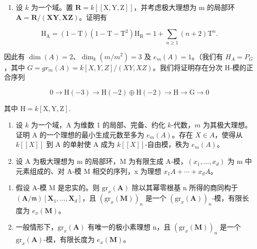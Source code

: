 \begin{enumerate}
\def\labelenumi{\arabic{enumi})}
\setcounter{enumi}{4}
\tightlist
\item
  设 \(k\) 为一个域。置 \(\mathbf{R} = k[[\mathrm{X},\mathrm{Y},\mathrm{Z}]]\)，并考虑极大理想为 m 的局部环 \(\mathbf{A} = \mathbf{R}/(\mathbf{XY},\mathbf{X}\mathbf{Z})\)。证明有
\end{enumerate}

\[
\mathrm{H} _ {\mathrm{A}} = (1 - \mathrm{T}) (1 - \mathrm{T} - \mathrm{T} ^ {2}) \mathrm{H} _ {\mathrm{R}} = 1 + \sum_ {n \geqslant 1} (n + 2) \mathrm{T} ^ {n}.
\]

因此有 \(\dim(A) = 2\)、\(\dim_k(m/m^2) = 3\) 及 \(e_m(A) = 1\)。（我们有 \(H_A = P_G\)，其中 \(G = gr_m(A) = k[X, Y, Z]/(XY, XZ)\)。我们将证明存在分次 H-模的正合序列

\[
0 \rightarrow \mathrm{H} (- 3) \rightarrow \mathrm{H} (- 2) \oplus \mathrm{H} (- 2) \rightarrow \mathrm{H} \rightarrow \mathrm{G} \rightarrow 0
\]

\(\text{其中 } \mathrm{H} = k[\mathrm{X},\mathrm{Y},\mathrm{Z}].\)

\begin{enumerate}
\def\labelenumi{\arabic{enumi})}
\setcounter{enumi}{5}
\item
  设 \(k\) 为一个域，A 为维数 1 的局部、完备、约化 \(k\)-代数，\(m\) 为其极大理想。证明 A 的一个理想的最小生成元数至多为 \(e_m(A)\)。存在 \(X \in A\)，使得从 \(k[[X]]\) 到 A 的单射使 A 成为 \(k[[X]]\)-自由模，秩为 \(e_m(A)\)。
\item
  设 A 为极大理想为 m 的局部环，M 为有限生成 A-模，\((x_{1}, \ldots, x_{d})\) 为 m 中元素组成的、对 A-模 M 相交的序列，x 为理想 \(x_{1}A + \cdots + x_{d}A\)。
\end{enumerate}

\begin{enumerate}
\def\labelenumi{\alph{enumi})}
\tightlist
\item
  假设 A-模 M 是忠实的。则 \(\mathrm{gr}_{x}(\mathbf{A})\) 除以其幂零根基 n 所得的商同构于 \((\mathbf{A}/\mathfrak{m})[\mathbf{X}_{1}, \ldots, \mathbf{X}_{d}]\)，且 \((\mathrm{gr}_{x}(\mathbf{M}))_{n}\) 是一个 \((\mathrm{gr}_{x}(\mathbf{A}))_{n}\)-模，有限长度为 \(e_{x}(\mathbf{M})\)。
\item
  一般情形下，\(\mathrm{gr}_{x}(\mathbf{A})\) 有唯一的极小素理想 n，且 \((\mathrm{gr}_{x}(\mathbf{M}))_{n}\) 是一个 \(\mathrm{gr}_{x}(\mathbf{A})\)-模，有限长度为 \(e_{x}(\mathbf{M})\)。
\end{enumerate}

